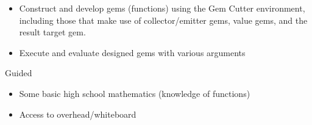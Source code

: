 	{
		\begin{itemize}
			\item Construct and develop gems (functions) using the Gem Cutter environment, including those that make use of collector/emitter gems, value gems, and the result target gem.
			\item Execute and evaluate designed gems with various arguments
		\end{itemize}
	}
	{Guided}
	{
		\begin{itemize}
			\item Some basic high school mathematics (knowledge of functions)
		\end{itemize}
	} %
	{
		\begin{itemize}
			\item Access to overhead/whiteboard
		\end{itemize}
	} %
